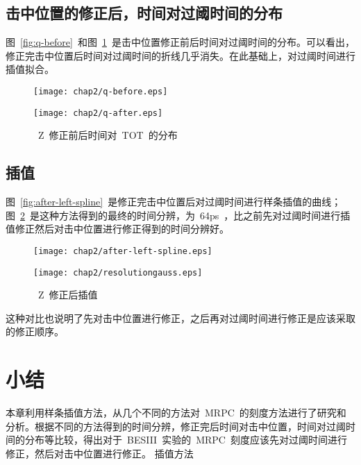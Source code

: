 \subsection{击中位置的修正后，时间对过阈时间的分布}

图~\ref{fig:q-before}~和图~\ref{fig:q-after}~是击中位置修正前后时间对过阈时间的分布。可以看出，修正完击中位置后时间对过阈时间的折线几乎消失。在此基础上，对过阈时间进行插值拟合。
\begin{figure}[!h]
\begin{minipage}[!h]{0.5\linewidth}
\texttt{[image: chap2/q-before.eps]}
\label{fig:q-before}
\end{minipage}%
\hfill
\begin{minipage}[!h]{0.5\linewidth}
\texttt{[image: chap2/q-after.eps]}
\label{fig:q-after}
\end{minipage}
\caption{~Z~修正前后时间对~TOT~的分布}
\end{figure}

\subsection{插值}

图~\ref{fig:after-left-spline}~是修正完击中位置后对过阈时间进行样条插值的曲线；图~\ref{fig:resolutiongauss}~是这种方法得到的最终的时间分辨，为~64ps~，比之前先对过阈时间进行插值修正然后对击中位置进行修正得到的时间分辨好。
\begin{figure}[!h]
\begin{minipage}[!h]{0.5\linewidth}
\texttt{[image: chap2/after-left-spline.eps]}
\label{fig:after-left-spline}
\end{minipage}%
\hfill
\begin{minipage}[!h]{0.5\linewidth}
\texttt{[image: chap2/resolutiongauss.eps]}
\label{fig:resolutiongauss}
\end{minipage}
\caption{~Z~修正后插值}
\end{figure}

这种对比也说明了先对击中位置进行修正，之后再对过阈时间进行修正是应该采取的修正顺序。

\section{小结}

本章利用样条插值方法，从几个不同的方法对~MRPC~的刻度方法进行了研究和分析。根据不同的方法得到的时间分辨，修正完后时间对击中位置，时间对过阈时间的分布等比较，得出对于~BESIII~实验的~MRPC~刻度应该先对过阈时间进行修正，然后对击中位置进行修正。
插值方法
